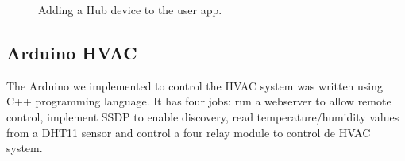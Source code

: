 \begin{figure}
\centering     %
{}
\caption{Adding a Hub device to the user app.}
\label{imp_user_camera}
\end{figure}




\subsection{Arduino HVAC}


The Arduino we implemented to control the HVAC system was written using C++ programming language. It has four jobs: run a webserver to allow remote control, implement \ac{SSDP} to enable discovery, read temperature/humidity values from a DHT11 sensor and control a four relay module to control de HVAC system.

